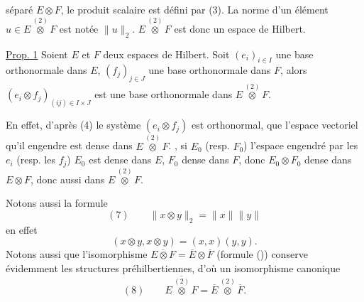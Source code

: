 séparé $E\otimes F$,   le produit scalaire est défini par (3).
La norme d'un élément  $u\in E\overset{(2)}\otimes F$ est notée $\|u\|_2$.
$E\overset{(2)}\otimes F$ est donc un espace de Hilbert.

\uline{Prop. 1} Soient $E$ et $F$ deux espaces de Hilbert. 
Soit $(e_i)_{i\in I}$ une base orthonormale dans $E$, $(f_j)_{j\in J}$ une base orthonormale dans $F$, alors $(e_i\otimes f_j)_{(ij)\in I\times J}$ est une base orthonormale dans $E\overset{(2)}\otimes F$.

En effet, d'après (4) le système $(e_i\otimes f_j)$ est orthonormal, 
  que l'espace vectoriel qu'il engendre est dense dans $E\overset{(2)}\otimes F$.
, si $E_0$ (resp. $F_0$)   l'espace engendré par les $e_i$ (resp. les $f_j$)  
$E_0$ est dense dans $E$, $F_0$ dense dans $F$, donc $E_0\otimes F_0$ dense dans $E\otimes F$, donc aussi dans $E\overset{(2)}\otimes F$.

Notons aussi la formule
\[
(7)\qquad\boxed{\|x\otimes y\|_2=\|x\|\|y\|}
\]
 en effet  
\[
(x\otimes y,x\otimes y)=(x,x)(y,y).
\]
Notons aussi que l'isomorphisme  $\overline{E\otimes F}=\overline E\otimes\overline F$ (formule ()) conserve évidemment les structures préhilbertiennes, d'où un isomorphisme canonique
\[
(8)\qquad\overline{E\overset{(2)}\otimes F}=\overline E\overset{(2)}\otimes\overline F.
\]
